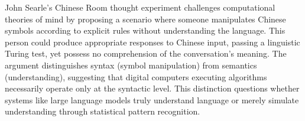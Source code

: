 John Searle's Chinese Room thought experiment challenges computational theories of mind by proposing a scenario where someone manipulates Chinese symbols according to explicit rules without understanding the language. This person could produce appropriate responses to Chinese input, passing a linguistic Turing test, yet possess no comprehension of the conversation's meaning. The argument distinguishes syntax (symbol manipulation) from semantics (understanding), suggesting that digital computers executing algorithms necessarily operate only at the syntactic level. This distinction questions whether systems like large language models truly understand language or merely simulate understanding through statistical pattern recognition.
